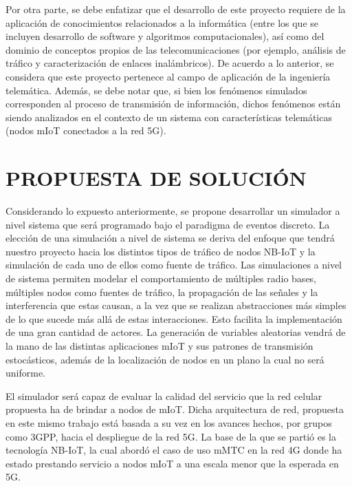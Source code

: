 Por otra parte, se debe enfatizar que el desarrollo de este proyecto requiere de la aplicación de conocimientos relacionados a la informática (entre los que se incluyen desarrollo de software y algoritmos computacionales), así como del dominio de conceptos propios de las telecomunicaciones (por ejemplo, análisis de tráfico y caracterización de enlaces inalámbricos). De acuerdo a lo anterior, se considera que este proyecto pertenece al campo de aplicación de la ingeniería telemática. Además, se debe notar que, si bien los fenómenos simulados corresponden al proceso de transmisión de información, dichos fenómenos están siendo analizados en el contexto de un sistema con características telemáticas (nodos mIoT conectados a la red 5G).\newline


\section{PROPUESTA DE SOLUCIÓN}

Considerando lo expuesto anteriormente, se propone desarrollar un simulador a nivel sistema que será programado bajo el paradigma de eventos discreto. La elección de una simulación a nivel de sistema se deriva del enfoque que tendrá nuestro proyecto hacia los distintos tipos de tráfico de nodos NB-IoT y la simulación de cada uno de ellos como fuente de tráfico. Las simulaciones a nivel de sistema permiten modelar el comportamiento de múltiples radio bases, múltiples nodos como fuentes de tráfico, la propagación de las señales y la interferencia que estas causan, a la vez que se realizan abstracciones más simples de lo que sucede más allá de estas interacciones. Esto facilita la implementación de una gran cantidad de actores. La generación de variables aleatorias vendrá de la mano de las distintas aplicaciones mIoT y sus patrones de transmisión estocásticos, además de la localización de  nodos en un plano la cual no será uniforme.\newline

El simulador será capaz de evaluar la calidad del servicio que la red celular propuesta ha de brindar a nodos de mIoT. Dicha arquitectura de red, propuesta en este mismo trabajo está basada a su vez en los avances hechos, por grupos como 3GPP, hacia el despliegue de la red 5G. La base de la que se partió es la tecnología NB-IoT, la cual abordó el caso de uso mMTC en la red 4G donde ha estado prestando servicio a nodos mIoT a una escala menor que la esperada en 5G.\newline

